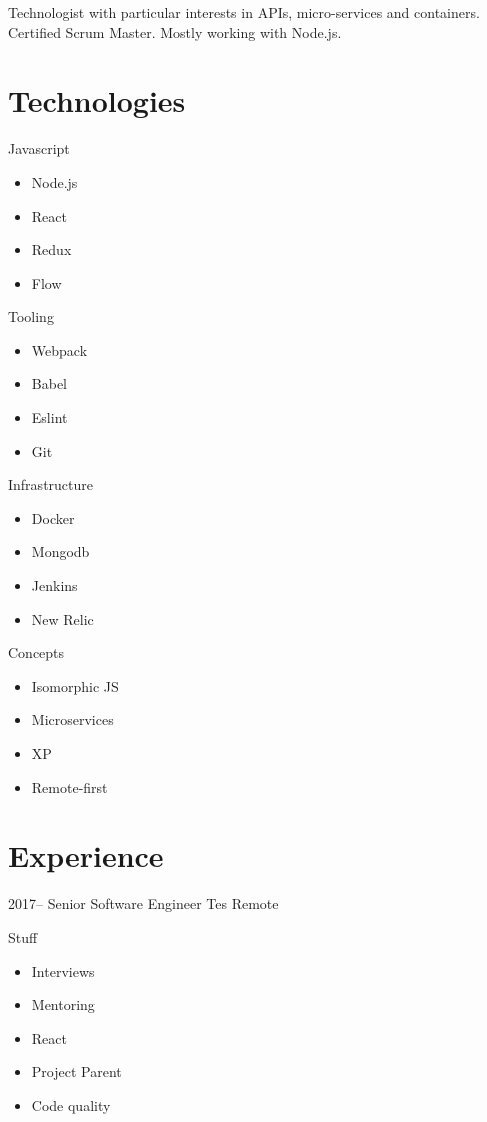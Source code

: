 \documentclass[10pt,a4paper,sans]{moderncv}
\date{11/08/2018}
\begin{document}
\makecvtitle

Technologist with particular interests in APIs, micro-services and containers. Certified Scrum Master. Mostly working with Node.js.

\section{Technologies}

\begin{cvcolumns}
  \cvcolumn
    {Javascript}
    {
      \begin{itemize}
        \item Node.js
        \item React
        \item Redux
        \item Flow
      \end{itemize}
    }

  \cvcolumn
    {Tooling}
    {
      \begin{itemize}
        \item Webpack
        \item Babel
        \item Eslint
        \item Git
      \end{itemize}
    }

  \cvcolumn
    {Infrastructure}
    {
      \begin{itemize}
        \item Docker
        \item Mongodb
        \item Jenkins
        \item New Relic
      \end{itemize}
    }

  \cvcolumn
    {Concepts}
    {
      \begin{itemize}
        \item Isomorphic JS
        \item Microservices
        \item XP
        \item Remote-first
      \end{itemize}
    }
\end{cvcolumns}

\section{Experience}

\cventry
  {2017--}
  {Senior Software Engineer}
  {Tes}
  {Remote}
  {}
  {
    Stuff
    \begin{itemize}
      \item Interviews
      \item Mentoring
      \item React
      \item Project Parent
      \item Code quality
    \end{itemize}
  }
\end{document}
